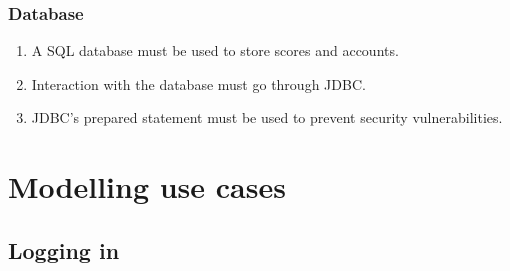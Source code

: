 \documentclass[10pt]{article}
\let\oldsection\section
\renewcommand\section{\clearpage\oldsection}
\begin{document}
		\subsubsection{Database}
			\begin{enumerate}[resume]
				\item A SQL database must be used to store scores and accounts.
				\item Interaction with the database must go through JDBC.
				\item JDBC's prepared statement must be used to prevent security vulnerabilities.
			\end{enumerate}

\section{Modelling use cases}
	\subsection{Logging in}
\end{document}
